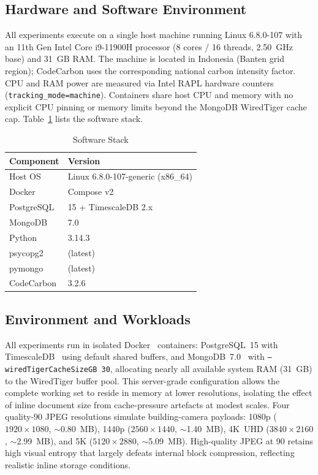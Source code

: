 \documentclass[conference]{IEEEtran}
\begin{document}
\subsection{Hardware and Software Environment}
All experiments execute on a single host machine running Linux 6.8.0-107 with an 11th Gen Intel Core i9-11900H processor (8 cores / 16 threads, 2.50~GHz base) and 31~GB RAM. The machine is located in Indonesia (Banten grid region); CodeCarbon uses the corresponding national carbon intensity factor. CPU and RAM power are measured via Intel RAPL hardware counters (\texttt{tracking\_mode=machine}). Containers share host CPU and memory with no explicit CPU pinning or memory limits beyond the MongoDB WiredTiger cache cap. Table~\ref{tab:software_versions} lists the software stack.

\begin{table}[htbp]
\centering
\renewcommand{\arraystretch}{1.1}
\caption{Software Stack}
\label{tab:software_versions}
\begin{tabular}{ll}
\hline
\textbf{Component} & \textbf{Version} \\
\hline
Host OS         & Linux 6.8.0-107-generic (x86\_64) \\
Docker          & Compose v2 \\
PostgreSQL      & 15 + TimescaleDB 2.x \\
MongoDB         & 7.0 \\
Python          & 3.14.3 \\
psycopg2        & (latest) \\
pymongo         & (latest) \\
CodeCarbon      & 3.2.6 \\
\hline
\end{tabular}
\end{table}

\subsection{Environment and Workloads}
All experiments run in isolated Docker~\cite{docker_official} containers: PostgreSQL~15 with TimescaleDB~\cite{timescaledb_official} using default shared buffers, and MongoDB~7.0~\cite{mongodb_official} with \texttt{--wiredTigerCacheSizeGB~30}, allocating nearly all available system RAM (31~GB) to the WiredTiger buffer pool. This server-grade configuration allows the complete working set to reside in memory at lower resolutions, isolating the effect of inline document size from cache-pressure artefacts at modest scales. Four quality-90 JPEG resolutions simulate building-camera payloads: 1080p ($1920{\times}1080$, $\sim$0.80~MB), 1440p ($2560{\times}1440$, $\sim$1.40~MB), 4K~UHD ($3840{\times}2160$, $\sim$2.99~MB), and 5K ($5120{\times}2880$, $\sim$5.09~MB). High-quality JPEG at 90 retains high visual entropy that largely defeats internal block compression, reflecting realistic inline storage conditions.
\end{document}
